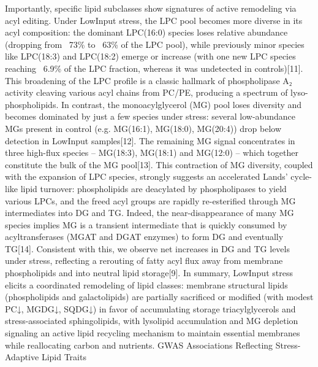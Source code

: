 \documentclass[10pt,letterpaper]{article}
\begin{document}
\begin{itemize}
Importantly, specific lipid subclasses show signatures of active remodeling via acyl editing. Under LowInput stress, the LPC pool becomes more diverse in its acyl composition: the dominant LPC(16:0) species loses relative abundance (dropping from ~73\% to ~63\% of the LPC pool), while previously minor species like LPC(18:3) and LPC(18:2) emerge or increase (with one new LPC species reaching ~6.9\% of the LPC fraction, whereas it was undetected in controls)[11]. This broadening of the LPC profile is a classic hallmark of phospholipase A₂ activity cleaving various acyl chains from PC/PE, producing a spectrum of lyso-phospholipids. In contrast, the monoacylglycerol (MG) pool loses diversity and becomes dominated by just a few species under stress: several low-abundance MGs present in control (e.g. MG(16:1), MG(18:0), MG(20:4)) drop below detection in LowInput samples[12]. The remaining MG signal concentrates in three high-flux species – MG(18:3), MG(18:1) and MG(12:0) – which together constitute the bulk of the MG pool[13]. This contraction of MG diversity, coupled with the expansion of LPC species, strongly suggests an accelerated Lands’ cycle-like lipid turnover: phospholipids are deacylated by phospholipases to yield various LPCs, and the freed acyl groups are rapidly re-esterified through MG intermediates into DG and TG. Indeed, the near-disappearance of many MG species implies MG is a transient intermediate that is quickly consumed by acyltransferases (MGAT and DGAT enzymes) to form DG and eventually TG[14]. Consistent with this, we observe net increases in DG and TG levels under stress, reflecting a rerouting of fatty acyl flux away from membrane phospholipids and into neutral lipid storage[9]. In summary, LowInput stress elicits a coordinated remodeling of lipid classes: membrane structural lipids (phospholipids and galactolipids) are partially sacrificed or modified (with modest PC↓, MGDG↓, SQDG↓) in favor of accumulating storage triacylglycerols and stress-associated sphingolipids, with lysolipid accumulation and MG depletion signaling an active lipid recycling mechanism to maintain essential membranes while reallocating carbon and nutrients.
GWAS Associations Reflecting Stress-Adaptive Lipid Traits

\end{itemize}
\end{document}
